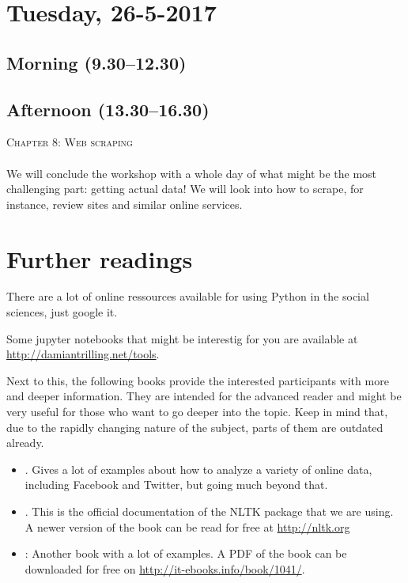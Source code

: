 \documentclass[a4paper,12pt]{report}
\begin{document}
\section*{Tuesday, 26-5-2017}
\subsection*{Morning (9.30--12.30)}
\subsection*{Afternoon (13.30--16.30)}
\textsc{ Chapter 8: Web scraping}\\
~\\
We will conclude the workshop with a whole day of what might be the most challenging part: getting actual data! We will look into how to scrape, for instance, review sites and similar online services.




\section*{Further readings}
There are a lot of online ressources available for using Python in the social sciences, just google it. 

Some jupyter notebooks that might be interestig for you are available at \url{http://damiantrilling.net/tools}.
%
%


Next to this, the following books provide the interested participants with more and deeper information. They are intended for the advanced reader and might be very useful for those who want to go deeper into the topic. Keep in mind that, due to the rapidly changing nature of the subject, parts of them are outdated already.

\begin{itemize}
	\item \citealp{Russel2013}. Gives a lot of examples about how to analyze a variety of online data, including Facebook and Twitter, but going much beyond that.
	\item \citealp{Bird2009}. This is the official documentation of the NLTK package that we are using. A newer version of the book can be read for free at \url{http://nltk.org}
	\item \citealp{McKinney2012}: Another book with a lot of examples. A PDF of the book can be downloaded for free on \url{http://it-ebooks.info/book/1041/}.
\end{itemize}







\end{document}
